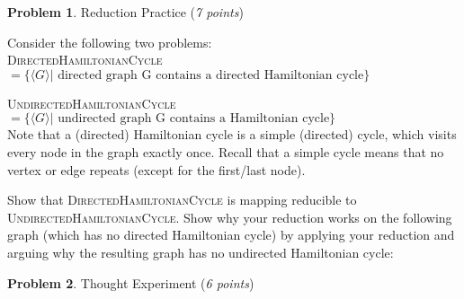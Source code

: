 \documentclass[11pt]{article}
\theoremstyle{definition}
\theoremstyle{theorem}
\newtheorem{prob}{Problem}
\newcommand{\solution}{\medskip\noindent{\color{blue}\textbf{Solution:}}}
\begin{document}
\newpage

\begin{prob} Reduction Practice (\emph{7 points})\end{prob}

Consider the following two problems:\\

\textsc{DirectedHamiltonianCycle} $= \{ \langle G \rangle | \text{ directed graph G contains a directed Hamiltonian cycle} \}$

\textsc{UndirectedHamiltonianCycle} $= \{ \langle G \rangle | \text{ undirected graph G contains a Hamiltonian cycle} \}$\\

Note that a (directed) Hamiltonian cycle is a simple (directed) cycle, which visits every node in the graph exactly once. Recall that a simple cycle means that no vertex or edge repeats (except for the first/last node).

Show that \textsc{DirectedHamiltonianCycle} is mapping reducible to \textsc{UndirectedHamiltonianCycle}. Show why your reduction works on the following graph (which has no directed Hamiltonian cycle) by applying your reduction and arguing why the resulting graph has no undirected Hamiltonian cycle:



\solution




\newpage

\begin{prob} Thought Experiment (\emph{6 points})\end{prob}
\end{document}
